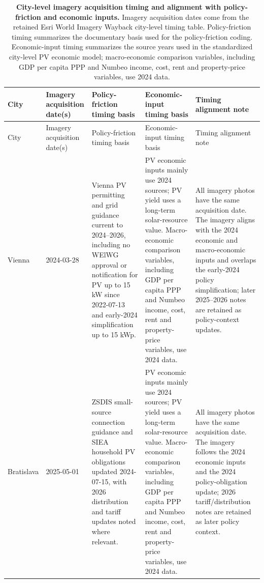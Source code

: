 {\scriptsize
\setlength{\tabcolsep}{3pt}
\renewcommand{\arraystretch}{1.08}
\begin{longtable}{@{}p{}p{}p{}p{}p{}@{}}
\caption{\textbf{City-level imagery acquisition timing and alignment with policy-friction and economic inputs.} Imagery acquisition dates come from the retained Esri World Imagery Wayback city-level timing table. Policy-friction timing summarizes the documentary basis used for the policy-friction coding. Economic-input timing summarizes the source years used in the standardized city-level PV economic model; macro-economic comparison variables, including GDP per capita PPP and Numbeo income, cost, rent and property-price variables, use 2024 data.}
\label{tab:imagery_timing_alignment}\\
\toprule
City & Imagery acquisition date(s) & Policy-friction timing basis & Economic-input timing basis & Timing alignment note \\
\midrule
\endfirsthead
\toprule
City & Imagery acquisition date(s) & Policy-friction timing basis & Economic-input timing basis & Timing alignment note \\
\midrule
\endhead
Vienna & 2024-03-28 & Vienna PV permitting and grid guidance current to 2024--2026, including no WElWG approval or notification for PV up to 15 kW since 2022-07-13 and early-2024 simplification up to 15 kWp. & PV economic inputs mainly use 2024 sources; PV yield uses a long-term solar-resource value. Macro-economic comparison variables, including GDP per capita PPP and Numbeo income, cost, rent and property-price variables, use 2024 data. & All imagery photos have the same acquisition date. The imagery aligns with the 2024 economic and macro-economic inputs and overlaps the early-2024 policy simplification; later 2025--2026 notes are retained as policy-context updates. \\
Bratislava & 2025-05-01 & ZSDIS small-source connection guidance and SIEA household PV obligations updated 2024-07-15, with 2026 distribution and tariff updates noted where relevant. & PV economic inputs mainly use 2024 sources; PV yield uses a long-term solar-resource value. Macro-economic comparison variables, including GDP per capita PPP and Numbeo income, cost, rent and property-price variables, use 2024 data. & All imagery photos have the same acquisition date. The imagery follows the 2024 economic inputs and the 2024 policy-obligation update; 2026 tariff/distribution notes are retained as later policy context. \\

\end{longtable}}
